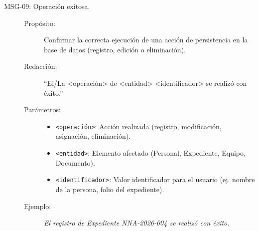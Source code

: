 \begin{description}
	\item[\hypertarget{mMSG09}{MSG-09: Operación exitosa.}] \cdtEmpty
		\begin{description}
			\item[Propósito:] Confirmar la correcta ejecución de una acción de persistencia en la base de datos (registro, edición o eliminación).
			\item[Redacción:] ``El/La <operación> de <entidad> <identificador> se realizó con éxito.''
			\item[Parámetros:] 
				\begin{itemize}
					\item \texttt{<operación>}: Acción realizada (registro, modificación, asignación, eliminación).
					\item \texttt{<entidad>}: Elemento afectado (Personal, Expediente, Equipo, Documento).
					\item \texttt{<identificador>}: Valor identificador para el usuario (ej. nombre de la persona, folio del expediente).
				\end{itemize}
			\item[Ejemplo:] {\em El registro de Expediente NNA-2026-004 se realizó con éxito.}
		\end{description}
\end{description}

